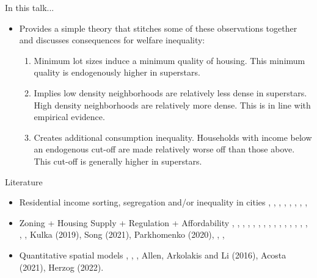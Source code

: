 \documentclass{beamer}
\theoremstyle{plain}
\begin{document}
\begin{frame}{In this talk...}
	\begin{itemize}
		\itemsep1em
		\item Provides a simple theory that stitches some of these observations together and discusses consequences for welfare inequality: \pause
		\begin{enumerate}
			\itemsep1em
			\color{black}
			\item  Minimum lot sizes induce a minimum quality of housing. This minimum quality is endogenously higher in superstars.  \pause
			\item Implies \color{blue}low \color{black} density neighborhoods are relatively \color{blue} less \color{black} dense in superstars. \color{red}High \color{black} density neighborhoods are relatively \color{red}more  \color{black} dense. This is in line with empirical evidence.\pause
			\item Creates additional consumption inequality. Households with income below an endogenous cut-off are made relatively worse off than those above. This cut-off is generally higher in superstars.
		\end{enumerate}
	\end{itemize}
\end{frame}

\begin{frame}{Literature}
\fontsize{8pt}{7.2}	
\begin{itemize}
	\itemsep4em
\item \color{red} Residential income sorting, segregation and/or inequality in cities \color{black} \cite{Coutureetal}, \cite{parispoor},  \cite{urbanrevival}, \cite{su2021}, \cite{endogentrification}, \cite{FogliGuerrieri}, \cite{ineqcitysize}, \cite{spatialsorting}, \cite{bshartley2020}

\item \color{purple} Zoning + Housing Supply + Regulation + Affordability \color{black} \cite{keepingpeopleout}, \cite{calabresetal}, \cite{Hamilton1975}, \cite{hamilton1976}, \cite{gyourkomolloy}, \cite{superstarcities}, \cite{mastwarding}, \cite{turner2014}, \cite{bbheight}, \cite{spatialSizeofUSUrbAreas}, \cite{gyourkovoith1997}, \cite{BSH}, \cite{hilber2021} \cite{HILBER2013}, \cite{op2014}, \cite{davidoff2022}, \cite{saiz2010}, \cite{griesonwhite}, Kulka (2019), Song (2021), Parkhomenko (2020), \cite{mastspillovers}, \cite{asquithetallocaleffects}, \cite{albouyetal}


\item \color{teal} Quantitative spatial models \color{black} \cite{quantspatial}, \cite{berlinwall}, \cite{transportinfrastructure}, Allen, Arkolakis and Li (2016), Acosta (2021), Herzog (2022). 
\end{itemize}
\end{frame}
\end{document}
